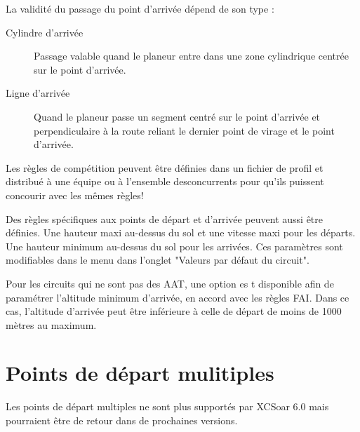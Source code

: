 La validité du passage du point d'arrivée dépend de son type :
\begin{description}
\item[Cylindre d'arrivée] Passage valable quand le planeur entre dans une zone cylindrique centrée sur le point d'arrivée.
\item[Ligne d'arrivée] Quand le planeur passe un segment centré sur le point d'arrivée et perpendiculaire à la route reliant le dernier point de virage et le point d'arrivée.
\end{description}


Les règles de compétition peuvent être définies dans un fichier de profil et distribué à une équipe ou à l'ensemble des\tip concurrents pour qu'ils puissent concourir avec les mêmes règles!

Des règles spécifiques aux points de départ et d'arrivée peuvent aussi être définies. Une hauteur maxi au-dessus du sol et une vitesse maxi pour les départs. Une hauteur minimum au-dessus du sol pour les arrivées. Ces paramètres sont modifiables dans le menu  \blink{} dans l'onglet "Valeurs par défaut du circuit".

Pour les circuits qui ne sont pas des AAT, une option es t disponible afin de paramétrer l'altitude minimum d'arrivée, en accord avec les règles FAI. Dans ce cas, l'altitude d'arrivée peut être inférieure à celle de départ de moins de 1000 mètres au maximum.

\section{Points de départ mulitiples}\label{sec:alternate-starts}

Les points de départ multiples ne sont plus supportés par XCSoar 6.0 mais pourraient être de retour dans de prochaines versions.




